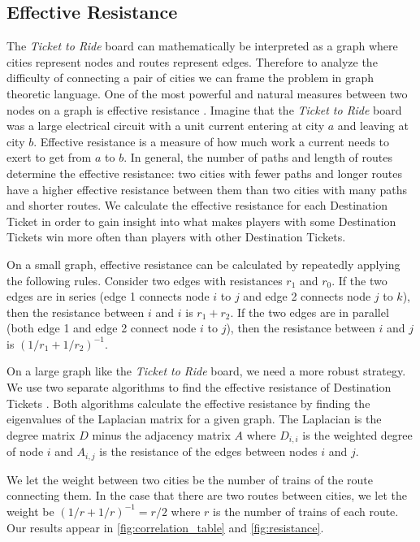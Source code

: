 \begin{multicols}{2}
\subsection{Effective Resistance}
The \textit{Ticket to Ride} board can mathematically
be interpreted as a graph where cities represent
nodes and routes represent edges.
Therefore to analyze the difficulty of connecting a
pair of cities we can frame the problem in graph theoretic language.
One of the most powerful and natural measures
between two nodes on a graph is effective resistance
\cite{ellens2011effective}.
Imagine that the \textit{Ticket to Ride} board was
a large electrical circuit with a unit current
entering at city $a$ and leaving at city $b$.
Effective resistance is a measure
of how much work a current needs to exert
to get from $a$ to $b$.
In general, the number of paths and length of routes 
determine the effective resistance:
two cities with fewer paths and longer routes
have a higher effective resistance between them
than two cities with many paths and shorter routes.
We calculate the effective resistance for each 
Destination Ticket in order to gain insight
into what makes players with some Destination Tickets
win more often than players with other Destination Tickets.

On a small graph, effective resistance can be calculated
by repeatedly applying the following rules.
Consider two edges with resistances $r_1$ and $r_0$.
If the two edges are in series (edge 1 connects node $i$ to $j$
and edge 2 connects node $j$ to $k$), then the resistance between
$i$ and $i$ is $r_1 + r_2$.
If the two edges are in parallel (both edge 1 and edge 2 connect
node $i$ to $j$), then the resistance between $i$ and $j$
is $(1/r_1 + 1/r_2)^{-1}$.

On a large graph like the \textit{Ticket to Ride} board, 
we need a more robust strategy.
We use two separate algorithms to find the effective resistance
of Destination Tickets
\cite{ellens2011effective, wu2004theory}.
Both algorithms calculate the effective resistance by finding 
the eigenvalues of the Laplacian matrix for a given graph.
The Laplacian is the degree matrix $D$ minus the adjacency
matrix $A$ where $D_{i,i}$ is the weighted degree of node $i$
and $A_{i,j}$ is the resistance of the edges between nodes
$i$ and $j$.

We let the weight between two cities be the number
of trains of the route connecting them.
In the case that there are two routes between cities,
we let the weight be $(1/r + 1/r)^{-1}=r/2$ where
$r$ is the number of trains of each route.
Our results appear in \cref{fig:correlation_table}
and \cref{fig:resistance}.


\end{multicols}
